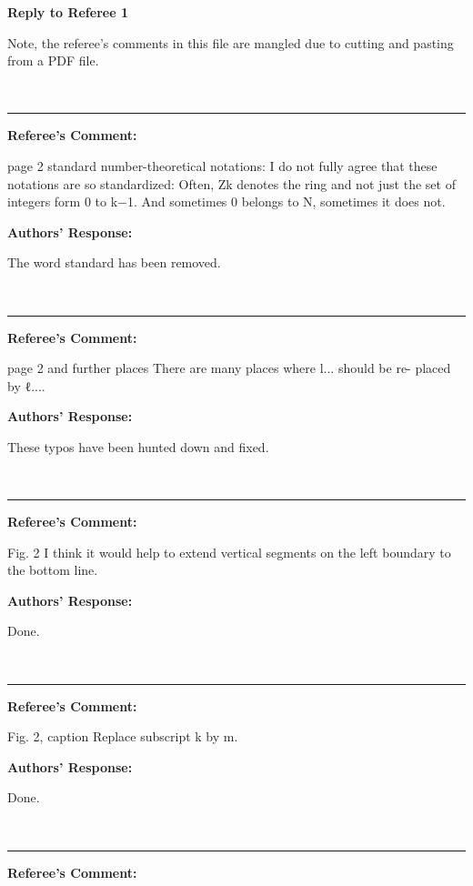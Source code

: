 \documentclass{article}
\begin{document}
\centerline{\textbf{Reply to Referee 1}}

Note, the referee's comments in this file are mangled due to cutting
and pasting from a PDF file.

\ \ \vspace{2ex}\hrule\vspace{2ex}
\noindent\textbf{Referee's Comment:}

page 2 standard number-theoretical notations: I do not fully agree that these
notations are so standardized: Often, Zk denotes the ring and not just the
set of integers form 0 to k−1. And sometimes 0 belongs to N, sometimes
it does not.

\noindent\textbf{Authors' Response:}

The word standard has been removed.

\ \ \vspace{2ex}\hrule\vspace{2ex}
\noindent\textbf{Referee's Comment:}

page 2 and further places There are many places where l... should be re-
placed by ℓ....

\noindent\textbf{Authors' Response:}

These typos have been hunted down and fixed.

\ \ \vspace{2ex}\hrule\vspace{2ex}
\noindent\textbf{Referee's Comment:}

Fig. 2 I think it would help to extend vertical segments on the left boundary
to the bottom line.


\noindent\textbf{Authors' Response:}

Done.


\ \ \vspace{2ex}\hrule\vspace{2ex}
\noindent\textbf{Referee's Comment:}

Fig. 2, caption Replace subscript k by m.

\noindent\textbf{Authors' Response:}

Done.


\ \ \vspace{2ex}\hrule\vspace{2ex}
\noindent\textbf{Referee's Comment:}
\end{document}
